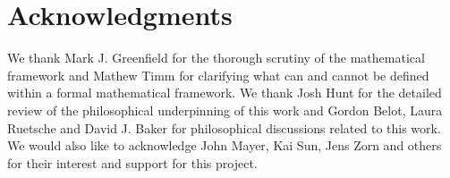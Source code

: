 \documentclass[twocolumn]{article}
\begin{document}
\section{Acknowledgments}

We thank Mark J. Greenfield for the thorough scrutiny of the mathematical framework and Mathew Timm for clarifying what can and cannot be defined within a formal mathematical framework. We thank Josh Hunt for the detailed review of the philosophical underpinning of this work and Gordon Belot, Laura Ruetsche and David J. Baker for philosophical discussions related to this work. We would also like to acknowledge John Mayer, Kai Sun, Jens Zorn and others for their interest and support for this project.



\end{document}
